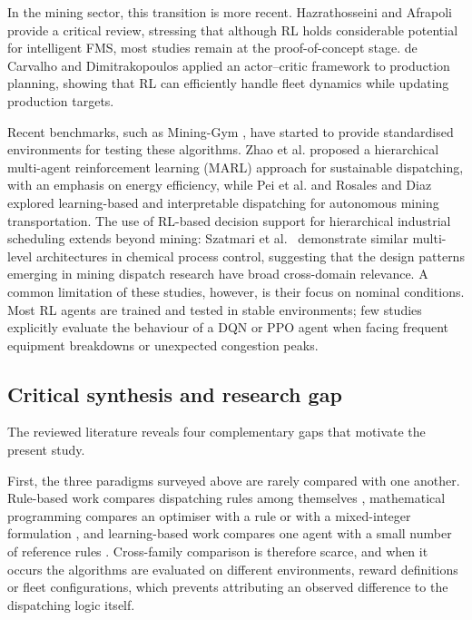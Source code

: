 \documentclass[11pt,a4paper]{article}
\begin{document}
In the mining sector, this transition is more recent. Hazrathosseini and Afrapoli \cite{Hazrathosseini2024} provide a critical review, stressing that although RL holds considerable potential for intelligent FMS, most studies remain at the proof-of-concept stage. de Carvalho and Dimitrakopoulos \cite{deCarvalho2023} applied an actor--critic framework to production planning, showing that RL can efficiently handle fleet dynamics while updating production targets.

Recent benchmarks, such as Mining-Gym \cite{Banerjee2025}, have started to provide standardised environments for testing these algorithms. Zhao et al. \cite{Zhao2025} proposed a hierarchical multi-agent reinforcement learning (MARL) approach for sustainable dispatching, with an emphasis on energy efficiency, while Pei et al. \cite{Pei2025} and Rosales and Diaz \cite{FranciscoRosales2025} explored learning-based and interpretable dispatching for autonomous mining transportation. The use of RL-based decision support for hierarchical industrial scheduling extends beyond mining: Szatmari et al.~\cite{KingaSzatmari2025} demonstrate similar multi-level architectures in chemical process control, suggesting that the design patterns emerging in mining dispatch research have broad cross-domain relevance. A common limitation of these studies, however, is their focus on nominal conditions. Most RL agents are trained and tested in stable environments; few studies explicitly evaluate the behaviour of a DQN or PPO agent when facing frequent equipment breakdowns or unexpected congestion peaks.

\subsection{Critical synthesis and research gap}
\label{sec:synthesis}

The reviewed literature reveals four complementary gaps that motivate the present study.

First, the three paradigms surveyed above are rarely compared with one another. Rule-based work compares dispatching rules among themselves \cite{Alarie2002, MehrnazMohtasham2023, Zeng2022}, mathematical programming compares an optimiser with a rule or with a mixed-integer formulation \cite{Soumis1989, AmandaSmith2020}, and learning-based work compares one agent with a small number of reference rules \cite{deCarvalho2023, Zhao2025}. Cross-family comparison is therefore scarce, and when it occurs the algorithms are evaluated on different environments, reward definitions or fleet configurations, which prevents attributing an observed difference to the dispatching logic itself.
\end{document}
